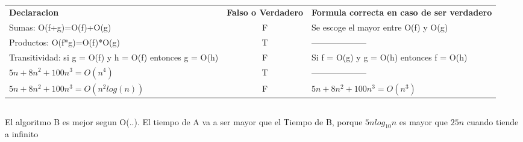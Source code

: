\documentclass[11pt]{article}
\begin{document}
\subsection{}
\begin{spacing}{1.75}
\begin{tabular}{p{5cm}cp{5cm}}
\textbf{Declaracion} & \textbf{Falso o Verdadero} & \textbf{Formula correcta en caso de ser verdadero}\\
Sumas: O(f+g)=O(f)+O(g) & F &  Se escoge el mayor entre O(f) y O(g) \\
Productos: O(f*g)=O(f)*O(g) & T & --------------------\\
Transitividad: si g = O(f) y h = O(f) entonces g = O(h) & F & Si f = O(g) y g = O(h) entonces f = O(h) \\
$5n+8n^2+100n^3=O(n^4)$ & T & -------------------- \\
$5n+8n^2 + 100n^3 = O(n^2log(n))$ & F & $5n+8n^2+100n^3 = O(n^3)$ \\

\end{tabular}
\end{spacing}
\subsection{}
\subsection{}
\subsection{}
\subsection{}
El algoritmo B es mejor segun O(..). El tiempo de A va a ser mayor que el Tiempo de B, porque $5nlog_10n$ es mayor que $25n$ cuando tiende a infinito
\end{document}
